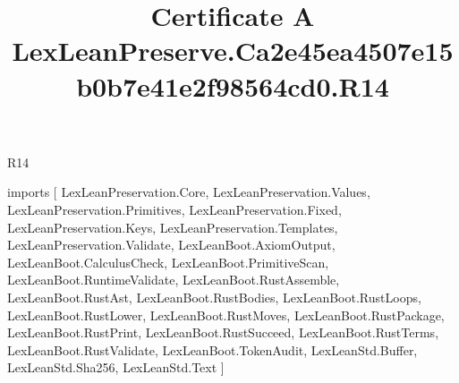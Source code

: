 \begin{lexlean}{R14}
\title{Certificate A LexLeanPreserve.Ca2e45ea4507e15b0b7e41e2f98564cd0.R14}
\begin{coremodule}
imports [
  LexLeanPreservation.Core,
  LexLeanPreservation.Values,
  LexLeanPreservation.Primitives,
  LexLeanPreservation.Fixed,
  LexLeanPreservation.Keys,
  LexLeanPreservation.Templates,
  LexLeanPreservation.Validate,
  LexLeanBoot.AxiomOutput,
  LexLeanBoot.CalculusCheck,
  LexLeanBoot.PrimitiveScan,
  LexLeanBoot.RuntimeValidate,
  LexLeanBoot.RustAssemble,
  LexLeanBoot.RustAst,
  LexLeanBoot.RustBodies,
  LexLeanBoot.RustLoops,
  LexLeanBoot.RustLower,
  LexLeanBoot.RustMoves,
  LexLeanBoot.RustPackage,
  LexLeanBoot.RustPrint,
  LexLeanBoot.RustSucceed,
  LexLeanBoot.RustTerms,
  LexLeanBoot.RustValidate,
  LexLeanBoot.TokenAudit,
  LexLeanStd.Buffer,
  LexLeanStd.Sha256,
  LexLeanStd.Text
]


\end{coremodule}
\end{lexlean}
